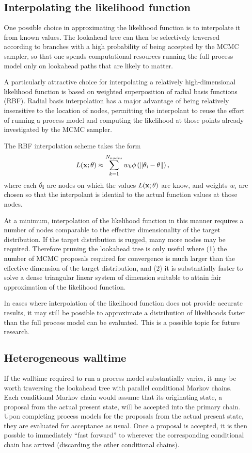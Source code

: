 \documentclass[10pt]{article}
\begin{document}
\subsection{Interpolating the likelihood function}
One possible choice in approximating the likelihood function is to interpolate it from known values.
The lookahead tree can then be selectively traversed according to branches with a high probability of being accepted by the MCMC sampler, so that one spends computational resources running the full process model only on lookahead paths that are likely to matter.

A particularly attractive choice for interpolating a relatively high-dimensional likelihood function is based on weighted superposition of radial basis functions (RBF).
Radial basis interpolation has a major advantage of being relatively insensitive to the location of nodes,
permitting the interpolant to reuse the effort of running a process model and computing the likelihood at those points already investigated by the MCMC sampler.

The RBF interpolation scheme takes the form
\begin{align*}
    L(\bf{x}; \bf{\theta}) &\approx \sum_{k=1}^{N_{nodes}} w_{k} \phi \left( \| \bf{\theta_i} - \bf{\theta} \| \right),
\end{align*}
where each $\bf{\theta_i}$ are nodes on which the values $L(\bf{x}; \bf{\theta})$ are know, and weights $w_i$ are chosen so that the interpolant is idential to the actual function values at those nodes.

At a minimum, interpolation of the likelihood function in this manner requires a number of nodes comparable to the effective dimensionality of the target distribution.
If the target distribution is rugged, many more nodes may be required.
Therefore pruning the lookahead tree is only useful where (1) the number of MCMC proposals required for convergence is much larger than the effective dimension of the target distribution, and (2) it is substantially faster to solve a dense triangular linear system of dimension suitable to attain fair approximation of the likelihood function.

In cases where interpolation of the likelihood function does not provide accurate results, it may still be possible to approximate a distribution of likelihoods faster than the full process model can be evaluated.
This is a possible topic for future research.

\subsection{Heterogeneous walltime}
If the walltime required to run a process model substantially varies, it may be worth traversing the lookahead tree with parallel conditional Markov chains.
Each conditional Markov chain would assume that its originating state, a proposal from the actual present state, will be accepted into the primary chain.
Upon completing process models for the proposals from the actual present state, they are evaluated for acceptance as usual.
Once a proposal is accepted, it is then possble to immediately ``fast forward'' to wherever the corresponding conditional chain has arrived (discarding the other conditional chains).
\end{document}
